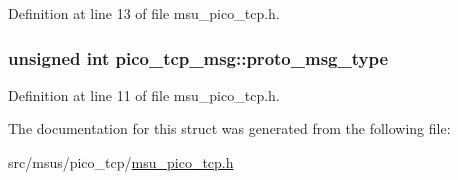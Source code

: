 Definition at line 13 of file msu\-\_\-pico\-\_\-tcp.\-h.

\hypertarget{structpico__tcp__msg_a6d32a0e6f66a430da0402ba2840c3ef9}{
\subsubsection[{proto\-\_\-msg\-\_\-type}]{\setlength{\rightskip}{0pt plus 5cm}unsigned int pico\-\_\-tcp\-\_\-msg\-::proto\-\_\-msg\-\_\-type}}\label{structpico__tcp__msg_a6d32a0e6f66a430da0402ba2840c3ef9}


Definition at line 11 of file msu\-\_\-pico\-\_\-tcp.\-h.



The documentation for this struct was generated from the following file\-:\begin{DoxyCompactItemize}
\item 
src/msus/pico\-\_\-tcp/\hyperlink{msu__pico__tcp_8h}{msu\-\_\-pico\-\_\-tcp.\-h}\end{DoxyCompactItemize}
